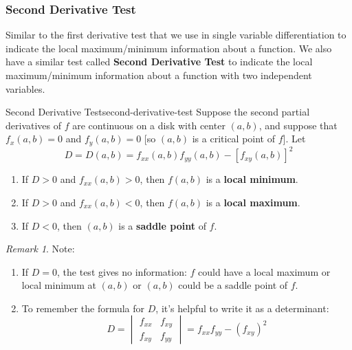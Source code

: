 \documentclass[math,code]{amznotes}
\theoremstyle{remark}
\newtheorem*{remark}{Remark}
\begin{document}
\subsubsection{Second Derivative Test}
Similar to the first derivative test that we use in single variable differentiation to indicate the local maximum/minimum information about a function. We also have a similar test called {\color{red} \textbf{Second Derivative Test}} to indicate the local maximum/minimum information about a function with two independent variables.
\begin{thmbox}{Second Derivative Test}{second-derivative-test}
    Suppose the second partial derivatives of $f$ are continuous on a disk with center $(a,b)$, and suppose that $f_x(a,b)=0$ and $f_y(a,b)=0$ [so $(a,b)$ is a critical point of $f$]. Let
    \begin{displaymath}
        D=D(a,b)=f_{xx}(a,b)f_{yy}(a,b)-[f_{xy}(a,b)]^2
    \end{displaymath}
    \begin{enumerate}
        \item If $D>0$ and $f_{xx}(a,b)>0$, then $f(a,b)$ is a {\color{red} \textbf{local minimum}}.
        \item If $D>0$ and $f_{xx}(a,b)<0$, then $f(a,b)$ is a {\color{red} \textbf{local maximum}}.
        \item If $D<0$, then $(a,b)$ is a {\color{red} \textbf{saddle point}} of $f$.
    \end{enumerate}
\end{thmbox}
\begin{notebox}
    \begin{remark}
        Note:
        \begin{enumerate}
            \item If $D=0$, the test gives no information: $f$ could have a local maximum or local minimum at $(a,b)$ or $(a,b)$ could be a saddle point of $f$.
            \item To remember the formula for $D$, it's helpful to write it as a determinant:
            \begin{displaymath}
                D =
                \begin{vmatrix}
                    f_{xx} & f_{xy} \\
                    f_{xy} & f_{yy}
                \end{vmatrix}
                = f_{xx}f_{yy} - (f_{xy})^2
            \end{displaymath}
        \end{enumerate}
    \end{remark}
\end{notebox}
\end{document}

